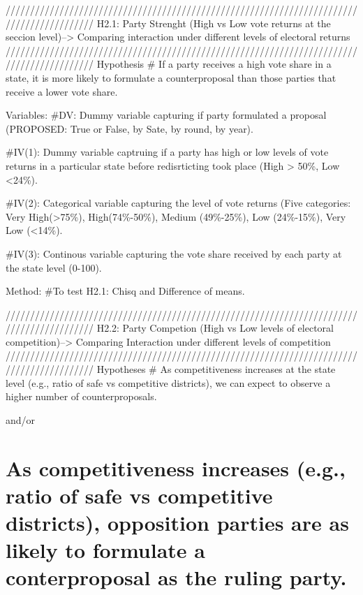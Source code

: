 \documentclass[
]{article}
\begin{document}
//////////////////////////////////////////////////////////////////////////////////////////
H2.1: Party Strenght (High vs Low vote returns at the seccion
level)--\textgreater{} Comparing interaction under different levels of
electoral returns
//////////////////////////////////////////////////////////////////////////////////////////
Hypothesis \# If a party receives a high vote share in a state, it is
more likely to formulate a counterproposal than those parties that
receive a lower vote share.

Variables: \#DV: Dummy variable capturing if party formulated a proposal
(PROPOSED: True or False, by Sate, by round, by year).

\#IV(1): Dummy variable captruing if a party has high or low levels of
vote returns in a particular state before redisrticting took place (High
\textgreater{} 50\%, Low \textless24\%).

\#IV(2): Categorical variable capturing the level of vote returns (Five
categories: Very High(\textgreater75\%), High(74\%-50\%), Medium
(49\%-25\%), Low (24\%-15\%), Very Low (\textless14\%).

\#IV(3): Continous variable capturing the vote share received by each
party at the state level (0-100).

Method: \#To test H2.1: Chisq and Difference of means.

//////////////////////////////////////////////////////////////////////////////////////////
H2.2: Party Competion (High vs Low levels of electoral
competition)--\textgreater{} Comparing Interaction under different
levels of competition
//////////////////////////////////////////////////////////////////////////////////////////
Hypotheses \# As competitiveness increases at the state level (e.g.,
ratio of safe vs competitive districts), we can expect to observe a
higher number of counterproposals.

and/or

\hypertarget{as-competitiveness-increases-e.g.-ratio-of-safe-vs-competitive-districts-opposition-parties-are-as-likely-to-formulate-a-conterproposal-as-the-ruling-party.}{%
\section{As competitiveness increases (e.g., ratio of safe vs
competitive districts), opposition parties are as likely to formulate a
conterproposal as the ruling
party.}\label{as-competitiveness-increases-e.g.-ratio-of-safe-vs-competitive-districts-opposition-parties-are-as-likely-to-formulate-a-conterproposal-as-the-ruling-party.}}
\end{document}

